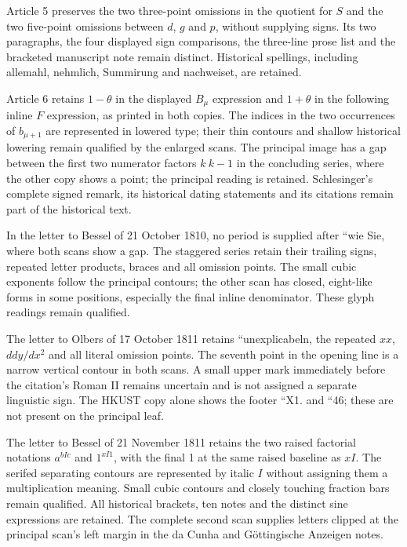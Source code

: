 \par Article 5 preserves the two three-point omissions in the quotient for $S$ and the two five-point omissions between $d$, $g$ and $p$, without supplying signs. Its two paragraphs, the four displayed sign comparisons, the three-line prose list and the bracketed manuscript note remain distinct. Historical spellings, including allemahl, nehmlich, Summirung and nachweiset, are retained.

\par Article 6 retains $1-\theta$ in the displayed $B_\mu$ expression and $1+\theta$ in the following inline $F$ expression, as printed in both copies. The indices in the two occurrences of $b_{\mu+1}$ are represented in lowered type; their thin contours and shallow historical lowering remain qualified by the enlarged scans. The principal image has a gap between the first two numerator factors $k\ k-1$ in the concluding series, where the other copy shows a point; the principal reading is retained. Schlesinger’s complete signed remark, its historical dating statements and its citations remain part of the historical text.

\par In the letter to Bessel of 21 October 1810, no period is supplied after ``wie Sie, where both scans show a gap. The staggered series retain their trailing signs, repeated letter products, braces and all omission points. The small cubic exponents follow the principal contours; the other scan has closed, eight-like forms in some positions, especially the final inline denominator. These glyph readings remain qualified.

\par The letter to Olbers of 17 October 1811 retains ``unexplicabeln, the repeated $xx$, $ddy/dx^2$ and all literal omission points. The seventh point in the opening line is a narrow vertical contour in both scans. A small upper mark immediately before the citation’s Roman II remains uncertain and is not assigned a separate linguistic sign. The HKUST copy alone shows the footer ``X1. and ``46; these are not present on the principal leaf.

\par The letter to Bessel of 21 November 1811 retains the two raised factorial notations $a^{bIc}$ and $1^{xI1}$, with the final 1 at the same raised baseline as $xI$. The serifed separating contours are represented by italic $I$ without assigning them a multiplication meaning. Small cubic contours and closely touching fraction bars remain qualified. All historical brackets, ten notes and the distinct sine expressions are retained. The complete second scan supplies letters clipped at the principal scan’s left margin in the da Cunha and Göttingische Anzeigen notes.

